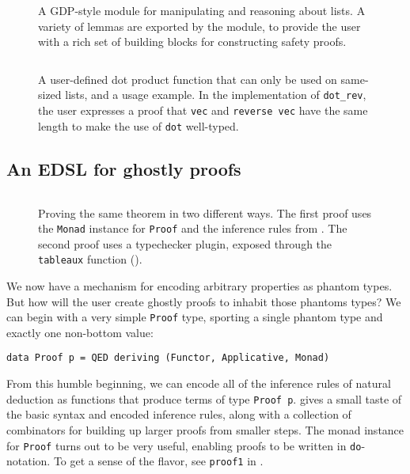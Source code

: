 \documentclass[format=sigplan, review=false, screen=true]{acmart}
\begin{document}
\begin{figure}
    \inputminted{haskell}{ex1.hs}
    \caption{A GDP-style module for manipulating and reasoning about lists.
      A variety of lemmas are exported by the module, to provide the
      user with a rich set of building blocks for constructing safety proofs.
       \label{lemma-demo}}
\end{figure}
\begin{figure}
    \inputminted{haskell}{ex2.hs}
    \caption{A user-defined dot product function that can only be used on same-sized lists,
      and a usage example. In the implementation of \texttt{dot\_rev}, the user expresses a proof that
      \texttt{vec} and \texttt{reverse vec} have the same length to make the use of \texttt{dot}
       well-typed.\label{dot-product}}
\end{figure}

\subsection{An EDSL for ghostly proofs}


\begin{figure}
  \inputminted{haskell}{tableaux.hs}
  \caption{Proving the same theorem in two different ways. The first proof
    uses the \texttt{Monad} instance for
    \texttt{Proof} and the inference rules from . The second
    proof uses a typechecker plugin, exposed through the \texttt{tableaux}
    function ().
    \label{tableaux-example}}
\end{figure}
We now have a mechanism for encoding arbitrary properties as phantom types. But how will the user
create ghostly proofs to inhabit those phantoms types?
We can begin with a very simple \texttt{Proof} type,
sporting a single phantom type and exactly one non-bottom value:
\begin{verbatim}
data Proof p = QED deriving (Functor, Applicative, Monad)
\end{verbatim} 
From this humble beginning, we can encode all of the inference rules of natural deduction as functions that
produce terms of type \texttt{Proof p}.
 gives a small taste of the basic syntax and encoded inference rules, along with
a collection of combinators for building up larger proofs from smaller steps.
The monad instance for \texttt{Proof} turns out to be very useful, enabling proofs to be written in
\texttt{do}-notation. To get a sense of the flavor, see \texttt{proof1} in .
\end{document}
